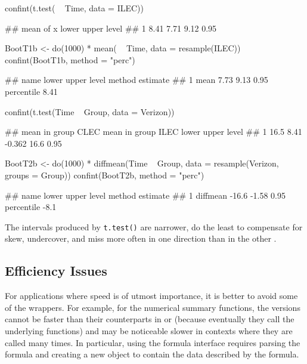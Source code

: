 \begin{Schunk}
\begin{Sinput}
confint(t.test( ~ Time, data = ILEC))
\end{Sinput}
\begin{Soutput}
##   mean of x lower upper level
## 1      8.41  7.71  9.12  0.95
\end{Soutput}
\begin{Sinput}
BootT1b <- 
  do(1000) * mean( ~ Time, data = resample(ILEC))
confint(BootT1b, method = "perc")
\end{Sinput}
\begin{Soutput}
##   name lower upper level     method estimate
## 1 mean  7.73  9.13  0.95 percentile     8.41
\end{Soutput}
\begin{Sinput}
confint(t.test(Time ~ Group, data = Verizon))
\end{Sinput}
\begin{Soutput}
##   mean in group CLEC mean in group ILEC  lower upper level
## 1               16.5               8.41 -0.362  16.6  0.95
\end{Soutput}
\begin{Sinput}
BootT2b <- 
  do(1000) * diffmean(Time ~ Group, data = resample(Verizon, groups = Group))
confint(BootT2b, method = "perc")
\end{Sinput}
\begin{Soutput}
##       name lower upper level     method estimate
## 1 diffmean -16.6 -1.58  0.95 percentile     -8.1
\end{Soutput}
\end{Schunk}

\noindent
The intervals produced by \texttt{t.test()} are narrower, do the least
to compensate for skew, undercover, and miss more often in one direction
than in the other \citep{Hesterberg:2015}.

\subsection{Efficiency Issues}\label{efficiency-issues}

For applications where speed is of utmost importance, it is better to
avoid some of the  wrappers. For example, for the numerical
summary functions, the  versions cannot be faster than their
counterparts in  or  (because eventually they call
the underlying functions) and may be noticeable slower in contexts where
they are called many times. In particular, using the formula interface
requires parsing the formula and creating a new object to contain the
data described by the formula.

